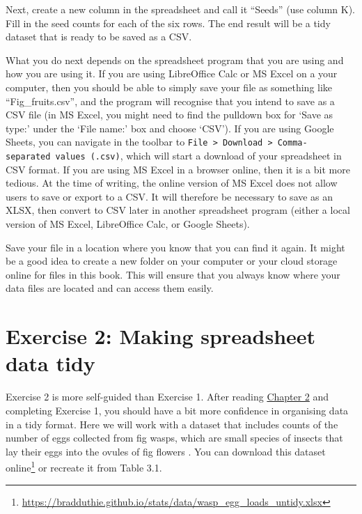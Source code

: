 \documentclass[
  openany]{krantz}
\begin{document}
Next, create a new column in the spreadsheet and call it ``Seeds'' (use column K).
Fill in the seed counts for each of the six rows.
The end result will be a tidy dataset that is ready to be saved as a CSV.

What you do next depends on the spreadsheet program that you are using and how you are using it.
If you are using LibreOffice Calc or MS Excel on a your computer, then you should be able to simply save your file as something like ``Fig\_fruits.csv'', and the program will recognise that you intend to save as a CSV file (in MS Excel, you might need to find the pulldown box for `Save as type:' under the `File name:' box and choose `CSV').
If you are using Google Sheets, you can navigate in the toolbar to \texttt{File\ \textgreater{}\ Download\ \textgreater{}\ Comma-separated\ values\ (.csv)}, which will start a download of your spreadsheet in CSV format.
If you are using MS Excel in a browser online, then it is a bit more tedious.
At the time of writing, the online version of MS Excel does not allow users to save or export to a CSV.
It will therefore be necessary to save as an XLSX, then convert to CSV later in another spreadsheet program (either a local version of MS Excel, LibreOffice Calc, or Google Sheets).

Save your file in a location where you know that you can find it again.
It might be a good idea to create a new folder on your computer or your cloud storage online for files in this book.
This will ensure that you always know where your data files are located and can access them easily.

\hypertarget{exercise-2-making-spreadsheet-data-tidy}{%
\section{Exercise 2: Making spreadsheet data tidy}\label{exercise-2-making-spreadsheet-data-tidy}}

Exercise 2 is more self-guided than Exercise 1.
After reading \protect\hyperlink{Chapter_2}{Chapter 2} and completing Exercise 1, you should have a bit more confidence in organising data in a tidy format.
Here we will work with a dataset that includes counts of the number of eggs collected from fig wasps, which are small species of insects that lay their eggs into the ovules of fig flowers \citep{Weiblen2002}.
You can download this dataset online\footnote{\url{https://bradduthie.github.io/stats/data/wasp_egg_loads_untidy.xlsx}} or recreate it from Table 3.1.
\end{document}
